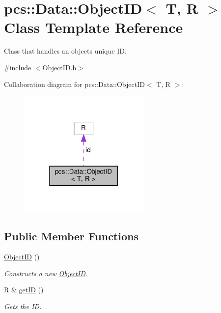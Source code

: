 \hypertarget{classpcs_1_1Data_1_1ObjectID}{}\section{pcs\+:\+:Data\+:\+:Object\+ID$<$ T, R $>$ Class Template Reference}
\label{classpcs_1_1Data_1_1ObjectID}


Class that handles an object\textquotesingle{}s unique ID.  




{\ttfamily \#include $<$Object\+I\+D.\+h$>$}



Collaboration diagram for pcs\+:\+:Data\+:\+:Object\+ID$<$ T, R $>$\+:\nopagebreak
\begin{figure}[H]
\begin{center}
\leavevmode
\includegraphics[width=184pt]{classpcs_1_1Data_1_1ObjectID__coll__graph}
\end{center}
\end{figure}
\subsection*{Public Member Functions}
\begin{DoxyCompactItemize}
\item 
\hyperlink{classpcs_1_1Data_1_1ObjectID_aa94cbbd6c36354f876de0b6847a07ed0}{Object\+ID} ()
\begin{DoxyCompactList}\small\item\em Constructs a new \hyperlink{classpcs_1_1Data_1_1ObjectID}{Object\+ID}. \end{DoxyCompactList}\item 
R \& \hyperlink{classpcs_1_1Data_1_1ObjectID_aaee6ebc98b85f079ff8597f5c6f39cb3}{get\+ID} ()
\begin{DoxyCompactList}\small\item\em Gets the ID. \end{DoxyCompactList}\end{DoxyCompactItemize}

